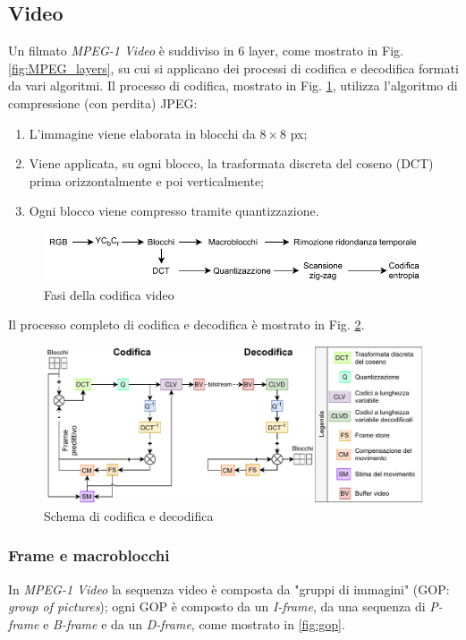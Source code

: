 \subsection{Video}
Un filmato \textit{MPEG-1 Video} è suddiviso in 6 layer, come mostrato in Fig. \ref{fig:MPEG_layers}, su cui si applicano dei processi di codifica e decodifica formati da vari algoritmi. Il processo di codifica, mostrato in Fig. \ref{fig:mpegPhases}, utilizza l'algoritmo di compressione (con perdita) JPEG:

\begin{enumerate}
    \item L'immagine viene elaborata in blocchi da $8\times8$ px;
    \item Viene applicata, su ogni blocco, la trasformata discreta del coseno (DCT) prima orizzontalmente e poi verticalmente;
    \item Ogni blocco viene compresso tramite quantizzazione.
\end{enumerate}

\begin{figure}[H]
	\includegraphics[width=\linewidth]{immagini/mpegPhases}
	\caption{Fasi della codifica video}
	\label{fig:mpegPhases}
\end{figure}

Il processo completo di codifica e decodifica è mostrato in Fig. \ref{fig:MPEGCodingScheme}.

\begin{figure}[H]
	\includegraphics[width=\linewidth]{immagini/MPEGCodingScheme}
	\centering
	\caption{Schema di codifica e decodifica}
	\label{fig:MPEGCodingScheme}
\end{figure}



\subsubsection{Frame e macroblocchi}
In \textit{MPEG-1 Video} la sequenza video è composta da "gruppi di immagini" (GOP: \textit{group of pictures}); ogni GOP è composto da un \textit{I-frame}, da una sequenza di \textit{P-frame} e \textit{B-frame} e da un \textit{D-frame}, come mostrato in \ref{fig:gop}.

